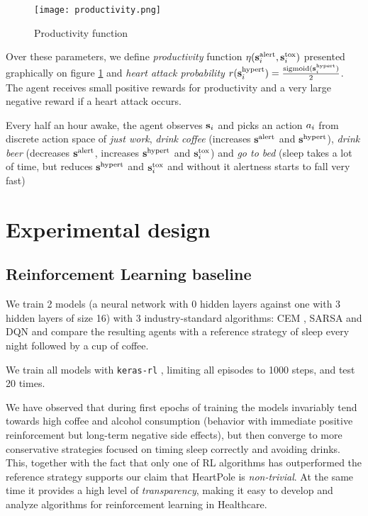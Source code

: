\begin{figure}
    \centering
    \texttt{[image: productivity.png]}
    \caption{Productivity function}
    \label{fig:productivity}
\end{figure}

Over these parameters, we define \emph{productivity} function $\eta(\textbf{s}^\text{alert}_i, \textbf{s}^\text{tox}_i)$ presented graphically on figure \ref{fig:productivity} and \emph{heart attack probability} $r(\textbf{s}^\text{hypert}_i)=\frac{\text{sigmoid}(\textbf{s}^\text{hypert}_i)}{2}$.
The agent receives small positive rewards for productivity and a very large negative reward if a heart attack occurs.

Every half an hour awake, the agent observes $\textbf{s}_i$ and picks an action $a_i$ from discrete action space of \emph{just work}, \emph{drink coffee} (increases $\textbf{s}^\text{alert}$ and $\textbf{s}^\text{hypert}$), \emph{drink beer} (decreases $\textbf{s}^\text{alert}$, increases $\textbf{s}^\text{hypert}$ and $\textbf{s}^\text{tox}_i$) and \emph{go to bed} (sleep takes a lot of time, but reduces $\textbf{s}^\text{hypert}$ and $\textbf{s}^\text{tox}_i$ and without it alertness starts to fall very fast)

\newpage
\section{Experimental design}
\label{sec:heartpole-experiments}

\subsection{Reinforcement Learning baseline}
We train 2 models (a neural network with 0 hidden layers against one with 3 hidden layers of size 16) with 3 industry-standard algorithms: CEM \cite{szitaLearningTetrisUsing2006}, SARSA \cite[Chapter 6]{suttonReinforcementLearningSecond2018} and DQN \cite{mnihPlayingAtariDeep2013,dqn} and compare the resulting agents with a reference strategy of sleep every night followed by a cup of coffee.

We train all models with \texttt{keras-rl} \cite{KerasrlKerasrlDeep}, limiting all episodes to 1000 steps, and test 20 times.

We have observed that during first epochs of training the models invariably tend towards high coffee and alcohol consumption (behavior with immediate positive reinforcement but long-term negative side effects), but then converge to more conservative strategies focused on timing sleep correctly and avoiding drinks. 
This, together with the fact that only one of RL algorithms has outperformed the reference strategy supports our claim that HeartPole is \emph{non-trivial}.
At the same time it provides a high level of \emph{transparency}, making it easy to develop and analyze algorithms for reinforcement learning in Healthcare.

